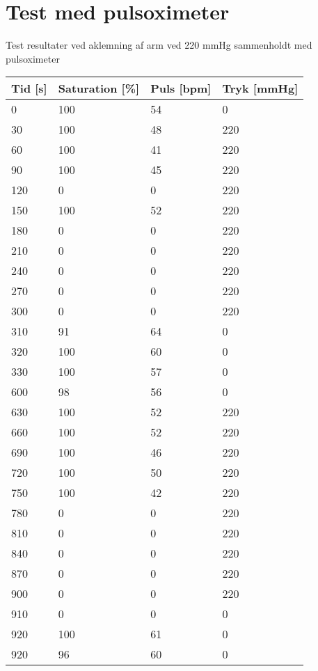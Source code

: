 \section{Test med pulsoximeter}

Test resultater ved aklemning af arm ved 220 mmHg sammenholdt med pulsoximeter
\begin{longtable}{p{} p{} p{} p{} }
	\hline
	Tid [s] & Saturation [\%] & Puls [bpm] & Tryk [mmHg] \\ \hline
	0 &	100 &	54 &	0 \\ \hline
	30 &	100 &	48 &	220 \\ \hline
	60 &	100 &	41 &	220 \\ \hline
	90 &	100	& 45  &	220 \\ \hline
	120	& 0	& 0	& 220 \\ \hline
	150 &	100 &	52 &	220 \\ \hline
	180	& 0 &	0 &	220 \\ \hline
	210	& 0	 & 0 &	220 \\ \hline
	240 &	0 &	0 &	220 \\ \hline
	270 &	0 &	0 &	220 \\ \hline
	300 &	0 &	0 &	220 \\ \hline
	310 &	91 &	64 &	0 \\ \hline
	320 &	100 &	60 &	0 \\ \hline
	330 &	100 &	57 &	0 \\ \hline
	600 &	98 &	56 &	0 \\ \hline
	630 &	100 &	52 &	220 \\ \hline
	660 &	100 &	52 &	220 \\ \hline
	690 &	100 &	46 &	220 \\ \hline
	720 &	100 &	50 &	220 \\ \hline
	750	 & 100 &	42 &	220 \\ \hline
	780 &	0 &	0 &	220 \\ \hline
	810 &	0 &	0 &	220 \\ \hline
	840 &	0 &	0 &	220 \\ \hline
	870 &	0 &	0 &	220 \\ \hline
	900 &	0 &	0 &	220 \\ \hline
	910 &	0 &	0 &	0 \\ \hline
	920 &	100 &	61 &	0 \\ \hline
	920 &	96 &	60 &	0 \\ \hline
\end{longtable}